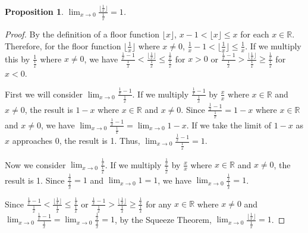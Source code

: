 \documentclass[11 pt]{article}
\newtheorem{proposition}{Proposition}
\newcommand{\newpar}{\vspace{.15in}\noindent}
\begin{document}
\newpar
\begin{proposition}
$\displaystyle{\lim_{x \to 0}\frac{\lfloor\frac{1}{x}\rfloor}{\frac{1}{x}}}=1$.
\end{proposition}
\begin{proof}
By the definition of a floor function $\lfloor x\rfloor$, $x-1<\lfloor x\rfloor\le x$ for each $x\in\mathbb{R}$. Therefore, for the floor function $\lfloor \frac{1}{x}\rfloor$ where $x\neq0$, $\frac{1}{x}-1<\lfloor\frac{1}{x}\rfloor\le\frac{1}{x}$. If we multiply this by $\frac{1}{\frac{1}{x}}$ where $x\neq0$, we have $\frac{\frac{1}{x}-1}{\frac{1}{x}}<\frac{\lfloor\frac{1}{x}\rfloor}{\frac{1}{x}}\le\frac{\frac{1}{x}}{\frac{1}{x}}$ for $x>0$ or $\frac{\frac{1}{x}-1}{\frac{1}{x}}>\frac{\lfloor\frac{1}{x}\rfloor}{\frac{1}{x}}\ge\frac{\frac{1}{x}}{\frac{1}{x}}$ for $x<0$.

\newpar
First we will consider $\displaystyle{\lim_{x \to 0}\frac{\frac{1}{x}-1}{\frac{1}{x}}}$. If we multiply $\frac{\frac{1}{x}-1}{\frac{1}{x}}$ by $\frac{x}{x}$ where $x\in\mathbb{R}$ and $x\neq0$, the result is $1-x$ where $x\in\mathbb{R}$ and $x\neq0$. Since $\frac{\frac{1}{x}-1}{\frac{1}{x}}=1-x$ where $x\in\mathbb{R}$ and $x\neq0$, we have $\displaystyle{\lim_{x \to 0}\frac{\frac{1}{x}-1}{\frac{1}{x}}}=\displaystyle{\lim_{x \to 0}}1-x$. If we take the limit of $1-x$ as $x$ approaches 0, the result is 1. Thus, $\displaystyle{\lim_{x \to 0}\frac{\frac{1}{x}-1}{\frac{1}{x}}}=1$.

\newpar
Now we consider $\displaystyle{\lim_{x \to 0}\frac{\frac{1}{x}}{\frac{1}{x}}}$. If we multiply $\frac{\frac{1}{x}}{\frac{1}{x}}$ by $\frac{x}{x}$ where $x\in\mathbb{R}$ and $x\neq0$, the result is 1. Since $\frac{\frac{1}{x}}{\frac{1}{x}}=1$ and $\displaystyle{\lim_{x \to 0}1}=1$, we have $\displaystyle{\lim_{x \to 0}\frac{\frac{1}{x}}{\frac{1}{x}}}=1$. 

\newpar
Since $\frac{\frac{1}{x}-1}{\frac{1}{x}}<\frac{\lfloor\frac{1}{x}\rfloor}{\frac{1}{x}}\le\frac{\frac{1}{x}}{\frac{1}{x}}$ or $\frac{\frac{1}{x}-1}{\frac{1}{x}}>\frac{\lfloor\frac{1}{x}\rfloor}{\frac{1}{x}}\ge\frac{\frac{1}{x}}{\frac{1}{x}}$ for any $x\in\mathbb{R}$ where $x\neq0$ and $\displaystyle{\lim_{x \to 0}\frac{\frac{1}{x}-1}{\frac{1}{x}}}=\displaystyle{\lim_{x \to 0}\frac{\frac{1}{x}}{\frac{1}{x}}}=1$, by the Squeeze Theorem, $\displaystyle{\lim_{x \to 0}\frac{\lfloor\frac{1}{x}\rfloor}{\frac{1}{x}}}=1$.

\end{proof}
\end{document}
